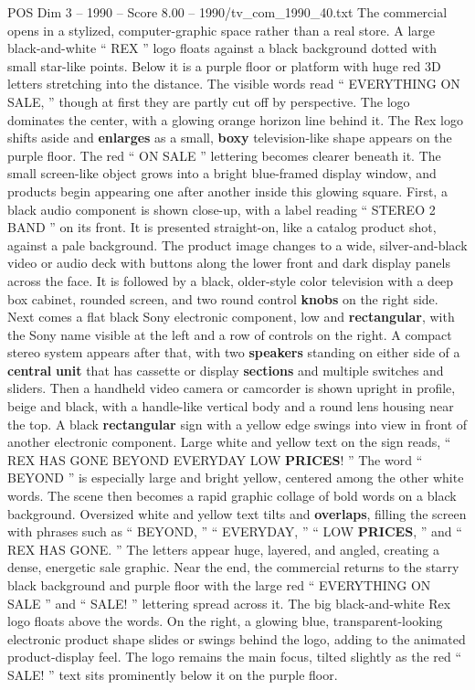 \begin{textsample}{POS Dim 3 – 1990 – Score 8.00 – 1990/tv\_com\_1990\_40.txt}  \label{ex:f3_pos_052}
The commercial opens in a stylized, computer-graphic space rather than a real store.
A large black-and-white “ REX ” logo floats against a black background dotted with small star-like points.
Below it is a purple floor or platform with huge red 3D letters stretching into the distance.
The visible words read “ EVERYTHING ON SALE, ” though at first they are partly cut off by perspective.
The logo dominates the center, with a glowing orange horizon line behind it.
The Rex logo shifts aside and \textbf{enlarges} as a small, \textbf{boxy} television-like shape appears on the purple floor.
The red “ ON SALE ” lettering becomes clearer beneath it.
The small screen-like object grows into a bright blue-framed display window, and products begin appearing one after another inside this glowing square.
First, a black audio component is shown close-up, with a label reading “ STEREO 2 BAND ” on its front.
It is presented straight-on, like a catalog product shot, against a pale background.
The product image changes to a wide, silver-and-black video or audio deck with buttons along the lower front and dark display panels across the face.
It is followed by a black, older-style color television with a deep box cabinet, rounded screen, and two round control \textbf{knobs} on the right side.
Next comes a flat black Sony electronic component, low and \textbf{rectangular}, with the Sony name visible at the left and a row of controls on the right.
A compact stereo system appears after that, with two \textbf{speakers} standing on either side of a \textbf{central} \textbf{unit} that has cassette or display \textbf{sections} and multiple switches and sliders.
Then a handheld video camera or camcorder is shown upright in profile, beige and black, with a handle-like vertical body and a round lens housing near the top.
A black \textbf{rectangular} sign with a yellow edge swings into view in front of another electronic component.
Large white and yellow text on the sign reads, “ REX HAS GONE BEYOND EVERYDAY LOW \textbf{PRICES}! ” The word “ BEYOND ” is especially large and bright yellow, centered among the other white words.
The scene then becomes a rapid graphic collage of bold words on a black background.
Oversized white and yellow text tilts and \textbf{overlaps}, filling the screen with phrases such as “ BEYOND, ” “ EVERYDAY, ” “ LOW \textbf{PRICES}, ” and “ REX HAS GONE. ” The letters appear huge, layered, and angled, creating a dense, energetic sale graphic.
Near the end, the commercial returns to the starry black background and purple floor with the large red “ EVERYTHING ON SALE ” and “ SALE! ” lettering spread across it.
The big black-and-white Rex logo floats above the words.
On the right, a glowing blue, transparent-looking electronic product shape slides or swings behind the logo, adding to the animated product-display feel.
The logo remains the main focus, tilted slightly as the red “ SALE! ” text sits prominently below it on the purple floor.

\end{textsample}
